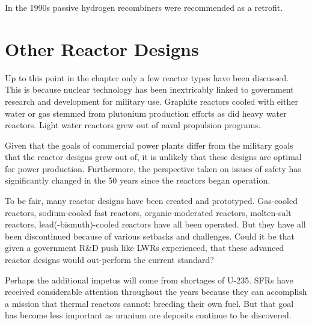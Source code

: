 In the 1990s passive hydrogen recombiners were recommended as a retrofit.

\section{Other Reactor Designs}
Up to this point in the chapter only a few reactor types have been discussed. This is because nuclear technology has been inextricably linked to government research and development for military use. 
Graphite reactors cooled with either water or gas stemmed from plutonium production efforts as did heavy water reactors. %
Light water reactors grew out of naval propulsion programs. 

Given that the goals of commercial power plants differ from the military goals that the reactor designs grew out of, it is unlikely that these designs are optimal for power production. Furthermore, the perspective taken on issues of safety has significantly changed in the 50 years since the reactors began operation. 

To be fair, many reactor designs have been created and prototyped. Gas-cooled reactors, sodium-cooled fast reactors, organic-moderated reactors, molten-salt reactors, lead(-bismuth)-cooled reactors have all been operated. But they have all been discontinued because of various setbacks and challenges. Could it be that given a government R\&D push like LWRs experienced, that these advanced reactor designs would out-perform the current standard?

Perhaps the additional impetus will come from shortages of U-235. SFRs have received considerable attention throughout the years because they can accomplish a mission that thermal reactors cannot: breeding their own fuel.
But that goal has become less important as uranium ore deposits continue to be discovered.



\begingroup
\let\cleardoublepage\clearpage




\endgroup